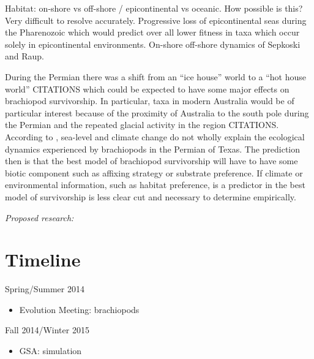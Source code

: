 \documentclass[12pt,letterpaper]{article}
\begin{document}
Habitat: on-shore vs off-shore / epicontinental vs oceanic. How possible is this? Very difficult to resolve accurately. Progressive loss of epicontinental seas during the Pharenozoic which would predict over all lower fitness in taxa which occur solely in epicontinental environments. On-shore off-shore dynamics of Sepkoski and Raup.

During the Permian there was a shift from an ``ice house'' world to a ``hot house world'' CITATIONS which could be expected to have some major effects on brachiopod survivorship. In particular, taxa in modern Australia would be of particular interest because of the proximity of Australia to the south pole during the Permian and the repeated glacial activity in the region CITATIONS. According to \citet{Olszewski2004}, sea-level and climate change do not wholly explain the ecological dynamics experienced by brachiopods in the Permian of Texas. The prediction then is that the best model of brachiopod survivorship will have to have some biotic component such as affixing strategy or substrate preference. If climate or environmental information, such as habitat preference, is a predictor in the best model of survivorship is less clear cut and necessary to determine empirically.


\textit{Proposed research:}






\clearpage
\section{Timeline}

Spring/Summer 2014
\begin{itemize}
  \item Evolution Meeting: brachiopods
\end{itemize}

Fall 2014/Winter 2015
\begin{itemize}
  \item GSA: simulation
\end{itemize}
\end{document}
